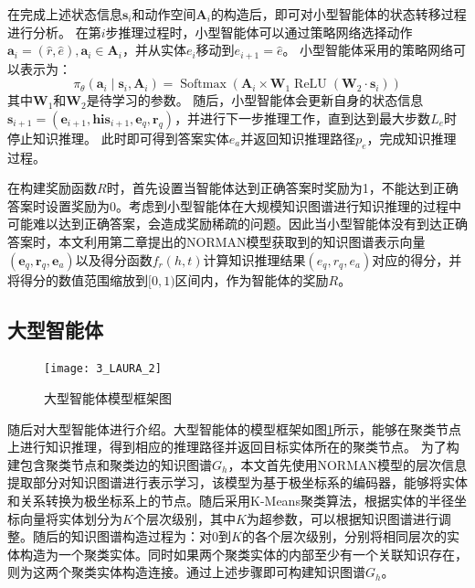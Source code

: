 \documentclass[algorithmlist, AutoFakeBold, AutoFakeSlant, figurelist, tablelist, nomlist, engineering, openany]{seuthesix} %
\begin{document}
在完成上述状态信息$\bm{s}_i$和动作空间$\bm{A}_i$的构造后，即可对小型智能体的状态转移过程进行分析。
在第$i$步推理过程时，小型智能体可以通过策略网络选择动作$\bm{a}_i = (\hat{r}, \hat{e}), \bm{a}_i \in \bm{A}_i$，并从实体$e_i$移动到$e_{i+1} = \hat{e}$。
小型智能体采用的策略网络可以表示为：
\begin{equation}
  \pi_\theta\left(\bm{a}_i \mid \bm{s}_i, \bm{A}_i\right) =\operatorname{Softmax}\left(\bm{A}_i \times \mathbf{W}_1 \operatorname{ReLU}\left(\mathbf{W}_2 \cdot \bm{s}_i\right)\right)
\end{equation}
其中$\mathbf{W}_1$和$\mathbf{W}_2$是待学习的参数。
随后，小型智能体会更新自身的状态信息$\bm{s}_{i+1} = (\bm{e}_{i+1}, \bm{his}_{i+1}, \bm{e}_q, \bm{r}_q)$，并进行下一步推理工作，直到达到最大步数$L_e$时停止知识推理。
此时即可得到答案实体$e_a$并返回知识推理路径$p_e$，完成知识推理过程。

在构建奖励函数$R$时，首先设置当智能体达到正确答案时奖励为1，不能达到正确答案时设置奖励为0。考虑到小型智能体在大规模知识图谱进行知识推理的过程中可能难以达到正确答案，会造成奖励稀疏的问题。因此当小型智能体没有到达正确答案时，本文利用第二章提出的NORMAN模型获取到的知识图谱表示向量$(\bm{e}_q, \bm{r}_q, \bm{e}_a)$以及得分函数$f_r(h, t)$计算知识推理结果$(e_q, r_q, e_a)$对应的得分，并将得分的数值范围缩放到$[0, 1)$区间内，作为智能体的奖励$R$。

\subsection{大型智能体}
\begin{figure}
  \centering
  \texttt{[image: 3\_LAURA\_2]}
  \caption{大型智能体模型框架图}
  \label{3_LAURA_2}
\end{figure}
随后对大型智能体进行介绍。大型智能体的模型框架如图\ref{3_LAURA_2}所示，能够在聚类节点上进行知识推理，得到相应的推理路径并返回目标实体所在的聚类节点。
为了构建包含聚类节点和聚类边的知识图谱$G_h$，本文首先使用NORMAN模型的层次信息提取部分对知识图谱进行表示学习，该模型为基于极坐标系的编码器，能够将实体和关系转换为极坐标系上的节点。随后采用K-Means聚类算法，根据实体的半径坐标向量将实体划分为$K$个层次级别，其中$K$为超参数，可以根据知识图谱进行调整。随后的知识图谱构造过程为：对0到$K$的各个层次级别，分别将相同层次的实体构造为一个聚类实体。同时如果两个聚类实体的内部至少有一个关联知识存在，则为这两个聚类实体构造连接。通过上述步骤即可构建知识图谱$G_h$。
\end{document}
